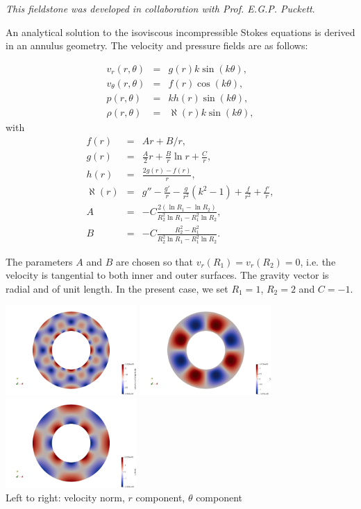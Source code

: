 
{\sl This fieldstone was developed in collaboration with Prof. E.G.P. Puckett}. 

An analytical solution to the
isoviscous incompressible Stokes equations is derived in an annulus geometry.
The velocity and pressure fields are as follows:

\begin{eqnarray}
v_r(r,\theta)     &=&  g(r) k \sin(k\theta), \\
v_\theta(r,\theta)&=&  f(r) \cos(k \theta), \\ 
p(r,\theta)       &=&  k h(r) \sin(k \theta), \\
\rho (r,\theta)   &=& \aleph(r) k \sin (k \theta), 
\end{eqnarray}
with
\begin{eqnarray}
f(r)&=&Ar+B/r, \\
g(r) &=& \frac{A}{2}r  +  \frac{B}{r} \ln r + \frac{C}{r}, \\
h(r)&=& \frac{2g(r)-f(r)}{r},  \\
\aleph(r) &=& g'' - \frac{g'}{r}  - \frac{g}{r^2} (k^2 - 1)  + \frac{f}{r^2}   + \frac{f'}{r}, \\
A &=& -C\frac{2(\ln R_1 - \ln R_2)} { R_2^2 \ln R_1  - R_1^2 \ln R_2}, \\
B &=& -C \frac{R_2^2-R_1^2}{R_2^2 \ln R_1 - R_1^2 \ln R_2}.
\end{eqnarray}

The parameters $A$ and $B$ are chosen so that $v_r(R_1)=v_r(R_2)=0$, i.e.
the velocity is tangential to both inner and outer surfaces.
The gravity vector is radial and of unit length.
In the present case, we set $R_1=1$, $R_2=2$ and $C=-1$. 

\begin{center}
\includegraphics[width=5cm]{python_codes/fieldstone_09/velocity}
\includegraphics[width=5cm]{python_codes/fieldstone_09/vr}
\includegraphics[width=5cm]{python_codes/fieldstone_09/vtheta}\\
{\small Left to right: velocity norm, $r$ component, $\theta$ component}
\end{center}

